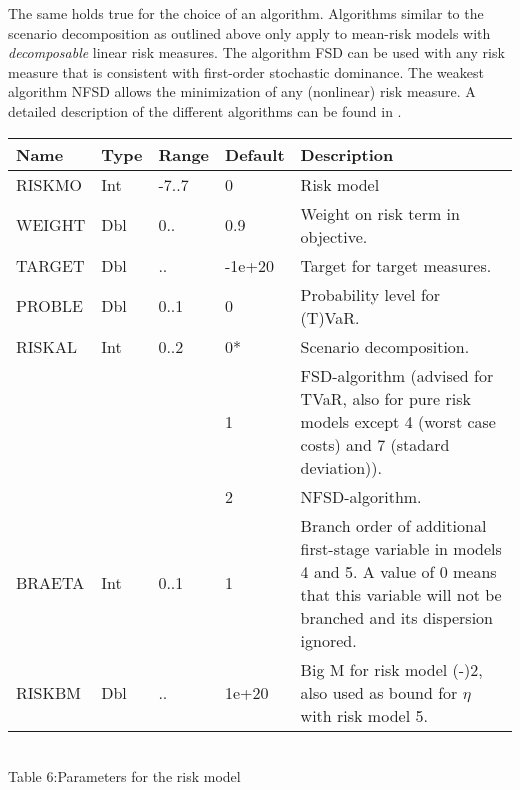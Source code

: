 \documentclass[11pt,draft]{article}
\newcommand{\+}{{\ti{+}}}
\newcommand{\1}{{\ti{1}}}
\begin{document}
The same holds true for the choice of an algorithm. Algorithms similar to the scenario decomposition
as outlined above only apply to mean-risk models with {\it decomposable} linear risk measures. The
algorithm FSD can be used with any risk measure that is consistent with first-order stochastic
dominance. The weakest algorithm NFSD allows the minimization of any (nonlinear) risk measure. A
detailed description of the different algorithms can be found in \cite{diss}. 
%
\begin{center}
\begin{tabular}{|llllp{5.9cm}|} 
\hline
Name&Type&Range&Default&Description\\ \hline
RISKMO&Int&-7..7&0&Risk model\medskip\\
WEIGHT&Dbl&0..&0.9&Weight on risk term in objective.\medskip\\
TARGET&Dbl&..&-1e+20&Target for target measures.\medskip\\
PROBLE&Dbl&0..1&0&Probability level for (T)VaR.\medskip\\
RISKAL&Int&0..2&0*&Scenario decomposition.\\
&&&1&FSD-algorithm (advised for TVaR, also for pure risk models except 4 (worst case costs) and 7 (stadard deviation)).\\
&&&2&NFSD-algorithm.\medskip\\
BRAETA&Int&0..1&1&Branch order of additional first-stage variable in models 4 and 5. A value of 0
means that this variable will not be branched
and its dispersion ignored.\medskip\\
RISKBM&Dbl&..&1e+20 &Big M for risk model (-)2, also used as bound for $\eta$ with risk model 5.\\
\hline
\end{tabular}
\\[0.5em]{Table 6:\quad Parameters for the risk model}
\end{center}%
\end{document}
